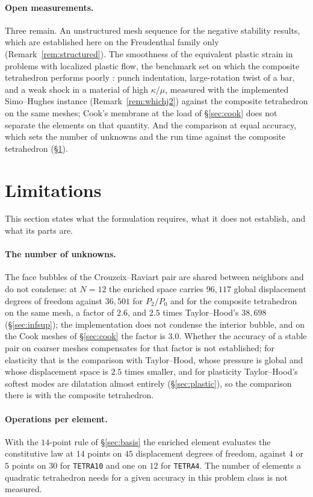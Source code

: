\documentclass[11pt]{article}
\newcommand{\code}[1]{\texttt{#1}}
\theoremstyle{definition}
\theoremstyle{plain}
\begin{document}
\paragraph{Open measurements.} Three remain. An unstructured mesh sequence
for the negative stability results, which are established here on the
Freudenthal family only (Remark~\ref{rem:structured}). The smoothness of the
equivalent plastic strain in problems with localized plastic flow, the
benchmark set on which the composite tetrahedron performs poorly
\citep{Foulk.etal:2021}: punch indentation, large-rotation twist of a bar,
and a weak shock in a material of high $\kappa/\mu$, measured with the
implemented Simo--Hughes instance (Remark~\ref{rem:whichj2}) against the
composite tetrahedron on the same meshes; Cook's membrane at the load of
\S\ref{sec:cook} does not separate the elements on that quantity. And the
comparison at equal accuracy, which sets the number of unknowns and the run
time against the composite tetrahedron (\S\ref{sec:risks}).

\section{Limitations}
\label{sec:risks}

This section states what the formulation requires, what it does not
establish, and what its parts are.

\paragraph{The number of unknowns.} The face bubbles of the Crouzeix--Raviart
pair are shared between neighbors and do not condense: at $N = 12$ the
enriched space carries $96{,}117$ global displacement degrees of freedom
against $36{,}501$ for $P_2/P_0$ and for the composite tetrahedron on the
same mesh, a factor of $2.6$, and $2.5$ times Taylor--Hood's $38{,}698$
(\S\ref{sec:infsup}); the implementation does not condense the interior
bubble, and on the Cook meshes of \S\ref{sec:cook} the factor is $3.0$.
Whether the accuracy of a stable pair on coarser meshes
compensates for that factor is not established; for elasticity that is the
comparison with Taylor--Hood, whose pressure is global and whose displacement
space is $2.5$ times smaller, and for plasticity Taylor--Hood's softest modes
are dilatation almost entirely (\S\ref{sec:plastic}), so the comparison there
is with the composite tetrahedron.

\paragraph{Operations per element.} With the $14$-point rule of
\S\ref{sec:basis} the enriched element evaluates the constitutive law at $14$
points on $45$ displacement degrees of freedom, against $4$ or $5$ points on
$30$ for \code{TETRA10} and one on $12$ for \code{TETRA4}. The number of
elements a quadratic tetrahedron needs for a given accuracy in this problem
class is not measured.
\end{document}

